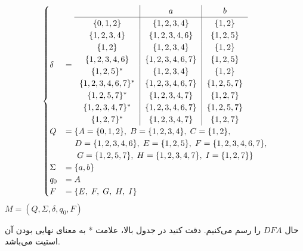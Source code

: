 \begin{center}
    \begin{equation*}
    \begin{cases}
        \delta &=
        \begin{tabular}{c|c|c}
         & $a$ & $b$\\ \hline
        $\{0,1,2\}$ & $\{1,2,3,4\}$ &$\{1,2\}$\\
        $\{1,2,3,4\}$ & $\{1,2,3,4,6\}$ &$\{1,2,5\}$\\
        $\{1,2\}$ & $\{1,2,3,4\}$ &$\{1,2\}$\\
        $\{1,2,3,4,6\}$ & $\{1,2,3,4,6,7\}$ &$\{1,2,5\}$\\
        $\{1,2,5\}^*$ & $\{1,2,3,4\}$ &$\{1,2\}$\\
        $\{1,2,3,4,6,7\}^*$ & $\{1,2,3,4,6,7\}$ &$\{1,2,5,7\}$\\
        $\{1,2,5,7\}^*$ & $\{1,2,3,4,7\}$ &$\{1,2,7\}$\\
        $\{1,2,3,4,7\}^*$ & $\{1,2,3,4,6,7\}$ &$\{1,2,5,7\}$\\
        $\{1,2,7\}^*$ & $\{1,2,3,4,7\}$ &$\{1,2,7\}$\\
        \end{tabular}\\[0.2in]
        Q &= \{ A=\{0,1,2\},\; B=\{1,2,3,4\},\;C=\{1,2\},\\
        &\;\;\;\; D=\{1,2,3,4,6\},\;
        E=\{1,2,5\},\; F=\{1,2,3,4,6,7\},\\
        &\;\;\;\; \;G=\{1,2,5,7\},\;H=\{1,2,3,4,7\},\; I=\{1,2,7\}\}\\
        \Sigma &= \{ a, b\} \\
        q_0 &= A\\
        F &= \{E,\;F,\;G,\;H,\; I\}\\
    \end{cases}
    \end{equation*}
    $M = (Q, \Sigma, \delta, q_0, F)$
    \\[0.3in]
\end{center}
حال $DFA$ را رسم می‌کنیم. دقت کنید در جدول بالا، علامت * به معنای نهایی بودن آن استیت می‌باشد.

